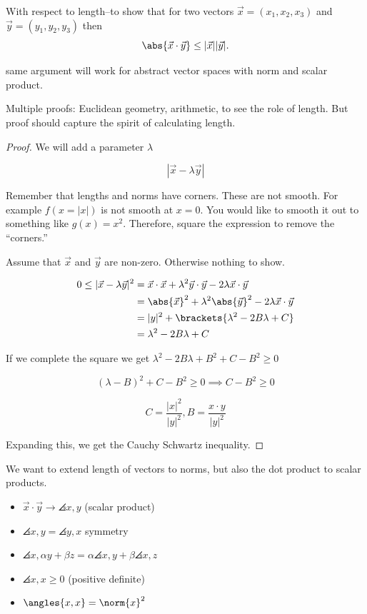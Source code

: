 \documentclass{scrreprt}
\begin{document}
\begin{theorem}
	With respect to length--to show that for two vectors $\vec{x} = (x_1, x_2, x_3)$ and $\vec{y} = (y_1, y_2, y_3)$ then 
	\[
		\abs{\vec{x}\cdot \vec{y}} \leq |\vec{x}| |\vec{y}|.
	\]

	same argument will work for abstract vector spaces with norm and scalar product.

	Multiple proofs: Euclidean geometry, arithmetic, to see the role of length. But proof should capture the spirit of calculating length.

	\begin{proof}
		We will add a parameter $\lambda$ 

		\[
			|\vec{x} - \lambda \vec{y}|
		\]

		Remember that lengths and norms have corners. These are not smooth.
		For example $f(x=|x|)$ is not smooth at $x=0$. You would like to smooth it
		out to something like $g(x)=x^2$. Therefore, square the expression to remove the ``corners.''

		Assume that $\vec{x}$ and $\vec{y}$ are non-zero. Otherwise nothing to show.

		\begin{align*}
			0 \leq |\vec{x}-\lambda \vec{y}|^2 &= \vec{x}\cdot \vec{x} + \lambda^2\vec{y}\cdot \vec{y} - 2\lambda\vec{x}\cdot \vec{y} \\ &= \abs{\vec{x}}^2 + \lambda^2\abs{\vec{y}}^2 - 2\lambda\vec{x}\cdot \vec{y} \\
			&= |y|^2 + \brackets{\lambda^2-2B\lambda+C} \\
			&= \lambda^2 - 2B\lambda + C
		\end{align*}

		If we complete the square we get $\lambda^2-2B\lambda + B^2 + C - B^2\geq 0$

		\[
			(\lambda - B)^2 + C - B^2 \geq 0 \implies \boxed{C-B^2\geq 0}
		\]

		\[
			C = \frac{|x|^2}{|y|^2}, B = \frac{x\cdot y}{|y|^2}
		\]

		Expanding this, we get the Cauchy Schwartz inequality.
	\end{proof}
\end{theorem}

We want to extend length of vectors to norms, but also the dot product to scalar products.

\begin{itemize}
	\item $\vec{x}\cdot \vec{y}\rightarrow \angles{x, y}$ (scalar product)
	\item $\angles{x,y}=\angles{y,x}$ symmetry
	\item $\angles{x,\alpha y + \beta z} = \alpha\angles{x, y} + \beta \angles{x, z}$ 
	\item $\angles{x,x} \geq 0$ (positive definite)
	\item $\angles{x,x} = \norm{x}^2$
\end{itemize}
\end{document}
